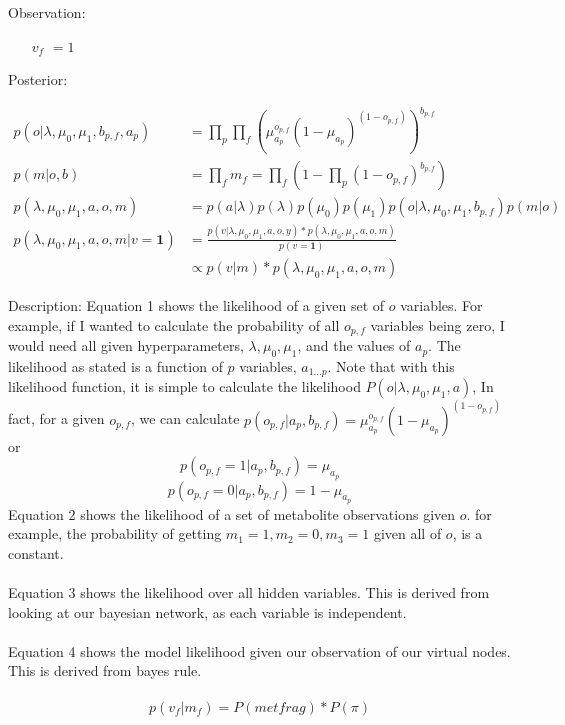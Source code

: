 \documentclass[11pt]{article}
\begin{document}
Observation:
\begin{itemize}
\item [$v_f$] $ = 1$
\end{itemize}

Posterior:

\begin{align}
p(o | \lambda, \mu_0, \mu_1, b_{p,f}, a_p) &= \prod_p \prod_{f} (\mu_{a_p}^{o_{p,f}} (1-\mu_{a_p})^{(1-o_{p,f})})^{b_{p,f}} \\
p(m | o, b) &= \prod_f m_f = \prod_f (1 - \prod_p (1 - o_{p,f})^{b_{p,f}}) \\
p(\lambda, \mu_0, \mu_1, a, o, m) &= p(a | \lambda )p(\lambda) p(\mu_0) p(\mu_1) p( o | \lambda, \mu_0, \mu_1, b_{p,f}) p(m | o) \\
p(\lambda, \mu_0, \mu_1, a, o, m | v = \mathbf{1}) &= \frac{p(v | \lambda, \mu_0, \mu_1, a, o, y) * p(\lambda, \mu_0, \mu_1, a, o, m)}{p(v = \mathbf{1})}  \\
&\propto p(v | m) * p(\lambda, \mu_0, \mu_1, a, o, m) 
\end{align}

Description:
Equation 1 shows the likelihood of a given set of $o$ variables. For example, if I wanted to calculate the probability of all $o_{p,f}$ variables being zero, I would need all given hyperparameters, $\lambda, \mu_0, \mu_1$, and the values of $a_p$. The likelihood as stated is a function of $p$ variables, $a_{1...p}$. Note that with this likelihood function, it is simple to calculate the likelihood $P(o | \lambda, \mu_0, \mu_1, a)$, In fact, for a given $o_{p,f}$, we can calculate $p(o_{p,f} | a_p, b_{p,f}) = \mu_{a_p}^{o_{p,f}} (1-\mu_{a_p})^{(1-o_{p,f})}$ or 
$$p(o_{p,f} = 1 | a_p, b_{p,f}) = \mu_{a_p}$$
$$p(o_{p,f} = 0 | a_p, b_{p,f}) = 1-\mu_{a_p}$$
Equation 2 shows the likelihood of a set of metabolite observations given $o$. for example, the probability of getting $m_1 = 1, m_2 = 0, m_3 = 1$ given all of $o$, is a constant.\\\\
Equation 3 shows the likelihood over all hidden variables. This is derived from looking at our bayesian network, as each variable is independent.\\\\
Equation 4 shows the model likelihood given our observation of our virtual nodes. This is derived from bayes rule. \\\\

$$p(v_f | m_f) = P(metfrag)  * P(\pi)$$
\end{document}
